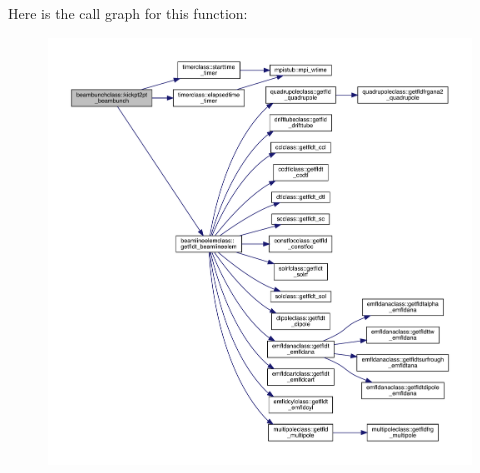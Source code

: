 Here is the call graph for this function\+:\nopagebreak
\begin{figure}[H]
\begin{center}
\leavevmode
\includegraphics[width=350pt]{namespacebeambunchclass_a8a635f6138c645606329c5c4b81bdf51_cgraph}
\end{center}
\end{figure}
\mbox{\label{namespacebeambunchclass_a01fdab4efb6d28b0604dfadfdbf302c1}} 
